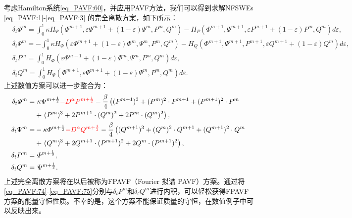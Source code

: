 考虑Hamilton系统\eqref{eq_PAVF:60}，并应用PAVF方法，我们可以得到求解NFSWEs \eqref{eq_PAVF:1}-\eqref{eq_PAVF:3} 的完全离散方案，如下所示：
\begin{align}
&\delta_{t} \varPhi^{m}=\int_{0}^{1}\kappa H_{\Psi}\left(\varPhi^{m+1}, \varepsilon \Psi^{m+1}+(1-\varepsilon) \Psi^{m}, P^{m}, Q^{m}\right)-H_{P}\left(\varPhi^{m+1}, \Psi^{m+1}, \varepsilon P^{m+1}+(1-\varepsilon) P^{m}, Q^{m}\right)d \varepsilon,\label{eq_PAVF:70}\\
&\delta_{t} \Psi^{m}=-\int_{0}^{1}\kappa H_{\varPhi}\left(\varepsilon \varPhi^{m+1}+(1-\varepsilon) \varPhi^{m}, \Psi^{m}, P^{m}, Q^{m}\right)-H_{Q}\left(\varPhi^{m+1}, \Psi^{m+1}, P^{m+1}, \varepsilon Q^{m+1}+(1-\varepsilon) Q^{m}\right)d\varepsilon,\label{eq_PAVF:71}\\
&\delta_{t} P^{m}=\int_{0}^{1}H_{\varPhi}\left(\varepsilon \varPhi^{m+1}+(1-\varepsilon) \varPhi^{m}, \Psi^{m}, P^{m}, Q^{m}\right) d \varepsilon,\label{eq_PAVF:72}\\
&\delta_{t} Q^{m}=\int_{0}^{1}H_{\Psi}\left(\varPhi^{m+1}, \varepsilon \Psi^{m+1}+(1-\varepsilon) \Psi^{m}, P^{m}, Q^{m}\right) d \varepsilon.\label{eq_PAVF:73}
\end{align}
上述数值方案可以进一步整合为：
\begin{align}
\delta_{t} \varPhi^{m}=&~\kappa \Psi^{m+\frac{1}{2}}\textcolor[rgb]{1.00,0.00,0.00}{-D^{\alpha} P^{m+\frac{1}{2}}}-\frac{\beta}{4}\left( (P^{m+1})^3+ (P^{m})^{2}\cdot P^{m+1}+(P^{m+1})^{2}\cdot P^{m}\right.\nonumber\\
	&+\left. (P^{m})^{3}+2 P^{m+1}\cdot (Q^{m})^{2}+2 P^{m}\cdot (Q^{m})^{2}\right),\label{eq_PAVF:74}\\
\delta_{t} \Psi^{m}=&-\kappa \varPhi^{m+\frac{1}{2}}\textcolor[rgb]{1.00,0.00,0.00}{-D^{\alpha} Q^{m+\frac{1}{2}}}-\frac{\beta}{4}\left( (Q^{m+1})^3+ (Q^{m})^{2}\cdot Q^{m+1}+(Q^{m+1})^{2}\cdot Q^{m}\right.\nonumber\\
	&+\left. (Q^{m})^{3}+2 Q^{m+1}\cdot (P^{m+1})^{2}+2 Q^{m}\cdot (P^{m+1})^{2}\right),\label{eq_PAVF:75}\\
\delta_{t} P^{m}=&~\varPhi^{m+\frac{1}{2}},\label{eq_PAVF:76}\\
\delta_{t} Q^{m}=&~\Psi^{m+\frac{1}{2}}.\label{eq_PAVF:77}
\end{align}
上述完全离散方案将在以后被称为FPAVF（Fourier 拟谱 PAVF）方案。通过将\eqref{eq_PAVF:74}-\eqref{eq_PAVF:75}分别与$\delta_t P^{m}$和$\delta_t Q^{m}$进行内积，可以轻松获得FPAVF方案的能量守恒性质。不幸的是，这个方案不能保证质量的守恒，在数值例子中可以反映出来。


